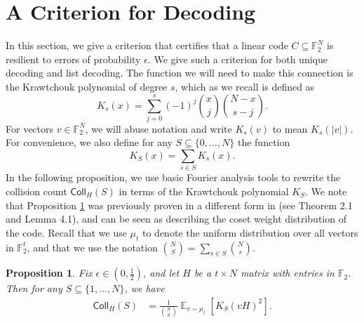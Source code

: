 \documentclass[12pt]{article}
\newtheorem{prop}[theorem]{Proposition}
\newcommand{\F}{\mathbb{F}}
\newcommand{\E}{\mathop \mathbb{E}}
\begin{document}
\section{A Criterion for Decoding}\label{weightdecoding}
In this section, we give a criterion that certifies that a linear code $C\subseteq\F_2^N$ is resilient to errors of probability $\epsilon$. We give such a criterion for both unique decoding and list decoding. The function we will need to make this connection is the Krawtchouk polynomial of degree $s$, which as we recall is defined as
$$K_s(x)=\sum_{j=0}^s(-1)^j\binom{x}{j}\binom{N-x}{s-j}.$$
For vectors $v\in\F_2^N$, we will abuse notation and write $K_s(v)$ to mean $K_s(|v|).$ For convenience, we also define for any $S\subseteq\{0,...,N\}$ the function
$$K_S(x)=\sum_{s\in S}K_s(x).$$
In the following proposition, we use basic Fourier analysis tools to rewrite the collision count $\mathsf{Coll}_H(S)$ in terms of the Krawtchouk polynomial $K_S$. We note that Proposition \ref{collisionprob} was previously proven in a different form in \cite{2021bargfourierlink} (see Theorem 2.1 and Lemma 4.1), and can be seen as describing the coset weight distribution of the code. Recall that we use $\mu_t$ to denote the uniform distribution over all vectors in $\mathbb{F}_2^t$, and that we use the notation $\binom{N}{S}=\sum_{s\in S}\binom{N}{s}$.
\begin{prop}\label{collisionprob}
Fix $\epsilon\in(0,\frac{1}{2})$, and let $H$ be a $t\times N$ matrix with entries in $\mathbb{F}_2$. Then for any $S\subseteq\{1,...,N\}$, we have
\begin{align*}
\mathsf{Coll}_H(S)&=\frac{1}{\binom{N}{S}}\E_{v\sim\mu_t}[K_S(vH)^2].
\end{align*}
\end{prop}
\end{document}
